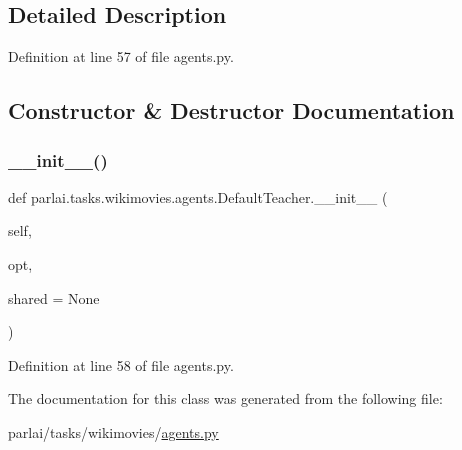 \subsection{Detailed Description}


Definition at line 57 of file agents.\+py.



\subsection{Constructor \& Destructor Documentation}
\mbox{\label{classparlai_1_1tasks_1_1wikimovies_1_1agents_1_1DefaultTeacher_a4bef6f1b4e0fff6a37c8ec1441cd9e6c}} 
\subsubsection{\texorpdfstring{\+\_\+\+\_\+init\+\_\+\+\_\+()}{\_\_init\_\_()}}
{\footnotesize\ttfamily def parlai.\+tasks.\+wikimovies.\+agents.\+Default\+Teacher.\+\_\+\+\_\+init\+\_\+\+\_\+ (\begin{DoxyParamCaption}\item[{}]{self,  }\item[{}]{opt,  }\item[{}]{shared = {\ttfamily None} }\end{DoxyParamCaption})}



Definition at line 58 of file agents.\+py.



The documentation for this class was generated from the following file\+:\begin{DoxyCompactItemize}
\item 
parlai/tasks/wikimovies/\hyperlink{parlai_2tasks_2wikimovies_2agents_8py}{agents.\+py}\end{DoxyCompactItemize}
